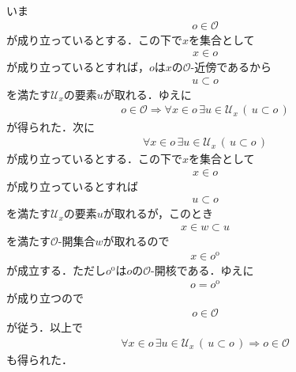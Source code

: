	\begin{sketch}
		いま
		\begin{align}
			o \in \mathscr{O}
		\end{align}
		が成り立っているとする．この下で$x$を集合として
		\begin{align}
			x \in o
		\end{align}
		が成り立っているとすれば，$o$は$x$の$\mathscr{O}$-近傍であるから
		\begin{align}
			u \subset o
		\end{align}
		を満たす$\mathcal{U}_{x}$の要素$u$が取れる．ゆえに
		\begin{align}
			o \in \mathscr{O} \Longrightarrow
			\forall x \in o\, \exists u \in \mathcal{U}_{x}\, (\, u \subset o\, )
		\end{align}
		が得られた．次に
		\begin{align}
			\forall x \in o\, \exists u \in \mathcal{U}_{x}\, (\, u \subset o\, )
		\end{align}
		が成り立っているとする．この下で$x$を集合として
		\begin{align}
			x \in o
		\end{align}
		が成り立っているとすれば
		\begin{align}
			u \subset o
		\end{align}
		を満たす$\mathcal{U}_{x}$の要素$u$が取れるが，このとき
		\begin{align}
			x \in w \subset u
		\end{align}
		を満たす$\mathscr{O}$-開集合$w$が取れるので
		\begin{align}
			x \in o^{\mathrm{o}}
		\end{align}
		が成立する．ただし$o^{\mathrm{o}}$は$o$の$\mathscr{O}$-開核である．ゆえに
		\begin{align}
			o = o^{\mathrm{o}}
		\end{align}
		が成り立つので
		\begin{align}
			o \in \mathscr{O}
		\end{align}
		が従う．以上で
		\begin{align}
			\forall x \in o\, \exists u \in \mathcal{U}_{x}\, (\, u \subset o\, )
			\Longrightarrow o \in \mathscr{O}
		\end{align}
		も得られた．
		\QED
	\end{sketch}
	
